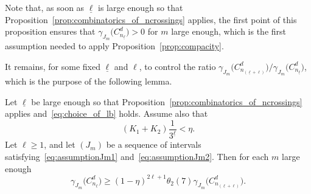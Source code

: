 \documentclass[AHL,Unicode,longabstracts]{cedram}
\newcommand{\cd}{C^{d}}
\newcommand{\lb}{\underline{\ell}}
\begin{document}
Note that, as soon as $\lb$ is large enough so that Proposition~\ref{prop:combinatorics_of_ncrossings} applies, the first point of this proposition ensures that $\gamma_{J_m}\bigl(\cd_{n_{\lb}}\bigr)>0$ for $m$ large enough, which is the first assumption needed to apply Proposition~\ref{prop:compacity}.

It remains, for some fixed $\lb$ and $\ell$, to control the ratio $\gamma_{J_m}\bigl(\cd_{n_{(\lb+\ell)}}\bigr)/\gamma_{J_m}\bigl(\cd_{n_{\lb}}\bigr)$, which is the purpose of the following lemma.

\begin{lemm}\label{lemma:ratio}
Let $\lb$ be large enough so that Proposition~\ref{prop:combinatorics_of_ncrossings} applies and~\eqref{eq:choice_of_lb} holds. Assume also that
\begin{equation}\label{eq:newcondlb}
(K_1+K_2)\frac{1}{3^{\lb}}<\eta.
\end{equation}
Let $\ell\ge1$, and let $(J_m)$ be a sequence of intervals satisfying~\eqref{eq:assumptionJm1} and~\eqref{eq:assumptionJm2}. Then for each $m$ large enough
\[
\gamma_{J_m}\bigl(\cd_{n_{\lb}}\bigr) \ge (1-\eta)^{2\ell+1} \theta_2(7)\gamma_{J_m} \bigl(\cd_{n_{(\lb+\ell)}}\bigr).
\]
\end{lemm}
\end{document}
